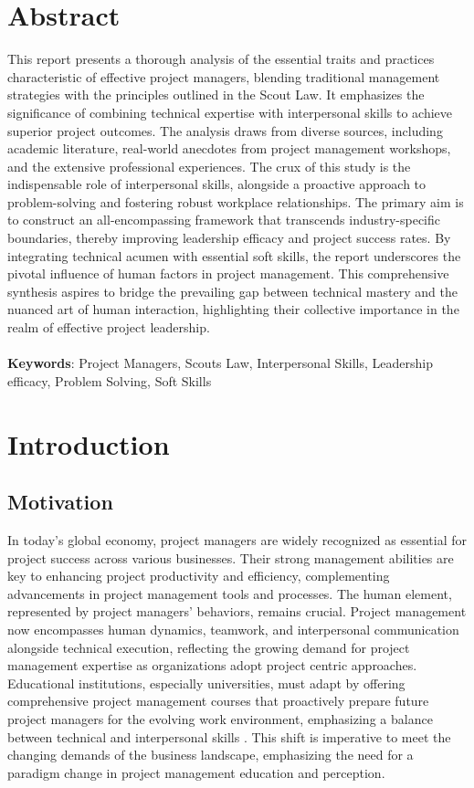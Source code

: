 \documentclass{article}
\begin{document}
\section*{Abstract}
This report presents a thorough analysis of the essential traits and practices characteristic of effective project managers, blending traditional management strategies with the principles outlined in the Scout Law. It emphasizes the significance of combining technical expertise with interpersonal skills to achieve superior project outcomes. The analysis draws from diverse sources, including academic literature, real-world anecdotes from project management workshops, and the extensive professional experiences. The crux of this study is the indispensable role of interpersonal skills, alongside a proactive approach to problem-solving and fostering robust workplace relationships. The primary aim is to construct an all-encompassing framework that transcends industry-specific boundaries, thereby improving leadership efficacy and project success rates. By integrating technical acumen with essential soft skills, the report underscores the pivotal influence of human factors in project management. This comprehensive synthesis aspires to bridge the prevailing gap between technical mastery and the nuanced art of human interaction, highlighting their collective importance in the realm of effective project leadership.
\\ \\
\textbf{Keywords}: Project Managers, Scouts Law, Interpersonal Skills, Leadership efficacy, Problem Solving, Soft Skills

\newpage

\section{Introduction}
\subsection{Motivation}
In today's global economy, project managers are widely recognized as essential for project success across various businesses. Their strong management abilities are key to enhancing project productivity and efficiency, complementing advancements in project management tools and processes. The human element, represented by project managers' behaviors, remains crucial. Project management now encompasses human dynamics, teamwork, and interpersonal communication alongside technical execution, reflecting the growing demand for project management expertise as organizations adopt project centric approaches. Educational institutions, especially universities, must adapt by offering comprehensive project management courses that proactively prepare future project managers for the evolving work environment, emphasizing a balance between technical and interpersonal skills \cite{pant2008project}. This shift is imperative to meet the changing demands of the business landscape, emphasizing the need for a paradigm change in project management education and perception.
\end{document}
